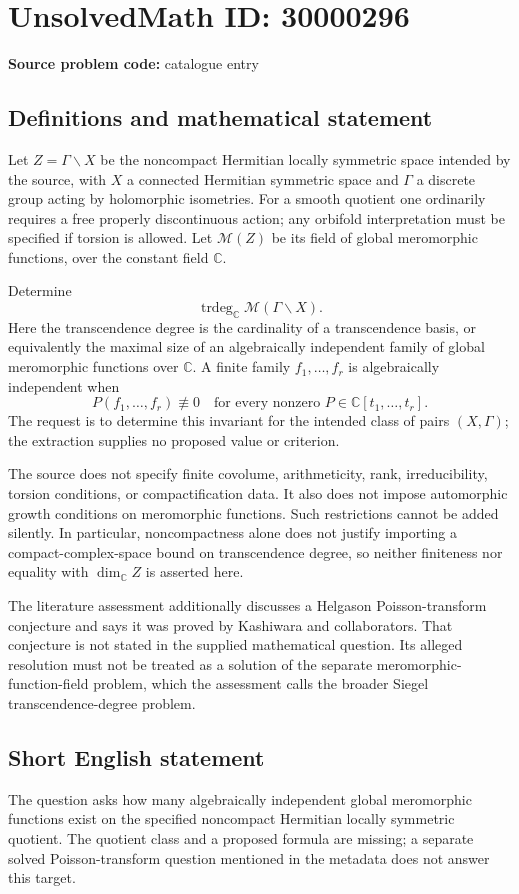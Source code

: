 \documentclass[11pt]{article}
\newcommand{\C}{\mathbb{C}}
\begin{document}
\section*{UnsolvedMath ID: 30000296}
\textbf{Source problem code:} catalogue entry
\subsection{Definitions and mathematical statement}
Let $Z=\Gamma\backslash X$ be the noncompact Hermitian locally symmetric space intended by the source, with $X$ a connected Hermitian symmetric space and $\Gamma$ a discrete group acting by holomorphic isometries. For a smooth quotient one ordinarily requires a free properly discontinuous action; any orbifold interpretation must be specified if torsion is allowed. Let $\mathcal M(Z)$ be its field of global meromorphic functions, over the constant field $\C$.

Determine
\[
 \operatorname{trdeg}_{\C}\mathcal M(\Gamma\backslash X).
\]
Here the transcendence degree is the cardinality of a transcendence basis, or equivalently the maximal size of an algebraically independent family of global meromorphic functions over $\C$. A finite family $f_1,\ldots,f_r$ is algebraically independent when
\[
 P(f_1,\ldots,f_r)\not\equiv0
 \quad\text{for every nonzero }P\in\C[t_1,\ldots,t_r].
\]
The request is to determine this invariant for the intended class of pairs $(X,\Gamma)$; the extraction supplies no proposed value or criterion.

The source does not specify finite covolume, arithmeticity, rank, irreducibility, torsion conditions, or compactification data. It also does not impose automorphic growth conditions on meromorphic functions. Such restrictions cannot be added silently. In particular, noncompactness alone does not justify importing a compact-complex-space bound on transcendence degree, so neither finiteness nor equality with $\dim_{\C}Z$ is asserted here.

The literature assessment additionally discusses a Helgason Poisson-transform conjecture and says it was proved by Kashiwara and collaborators. That conjecture is not stated in the supplied mathematical question. Its alleged resolution must not be treated as a solution of the separate meromorphic-function-field problem, which the assessment calls the broader Siegel transcendence-degree problem.
\subsection{Short English statement}
The question asks how many algebraically independent global meromorphic functions exist on the specified noncompact Hermitian locally symmetric quotient. The quotient class and a proposed formula are missing; a separate solved Poisson-transform question mentioned in the metadata does not answer this target.
\end{document}
